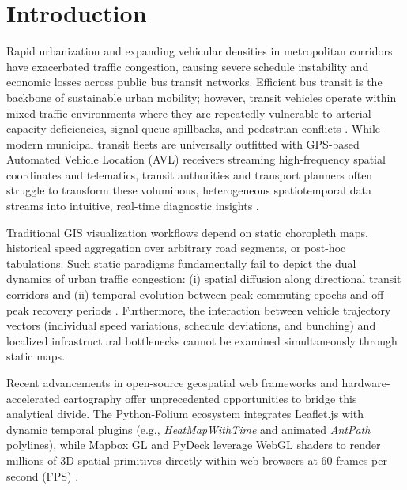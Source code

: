 \documentclass[conference]{IEEEtran}
\begin{document}
\section{Introduction}
Rapid urbanization and expanding vehicular densities in metropolitan corridors have exacerbated traffic congestion, causing severe schedule instability and economic losses across public bus transit networks. Efficient bus transit is the backbone of sustainable urban mobility; however, transit vehicles operate within mixed-traffic environments where they are repeatedly vulnerable to arterial capacity deficiencies, signal queue spillbacks, and pedestrian conflicts \cite{zheng2015trajectory, wang2021spatiotemporal}. While modern municipal transit fleets are universally outfitted with GPS-based Automated Vehicle Location (AVL) receivers streaming high-frequency spatial coordinates and telematics, transit authorities and transport planners often struggle to transform these voluminous, heterogeneous spatiotemporal data streams into intuitive, real-time diagnostic insights \cite{tang2016network, li2018urban}.

Traditional GIS visualization workflows depend on static choropleth maps, historical speed aggregation over arbitrary road segments, or post-hoc tabulations. Such static paradigms fundamentally fail to depict the dual dynamics of urban traffic congestion: (i) spatial diffusion along directional transit corridors and (ii) temporal evolution between peak commuting epochs and off-peak recovery periods \cite{andrienko2017visual, du2020spatiotemporal}. Furthermore, the interaction between vehicle trajectory vectors (individual speed variations, schedule deviations, and bunching) and localized infrastructural bottlenecks cannot be examined simultaneously through static maps.

Recent advancements in open-source geospatial web frameworks and hardware-accelerated cartography offer unprecedented opportunities to bridge this analytical divide. The Python-Folium ecosystem integrates Leaflet.js with dynamic temporal plugins (e.g., \textit{HeatMapWithTime} and animated \textit{AntPath} polylines), while Mapbox GL and PyDeck leverage WebGL shaders to render millions of 3D spatial primitives directly within web browsers at 60 frames per second (FPS) \cite{giesen2019interactive, zhang2023mining}.
\end{document}
